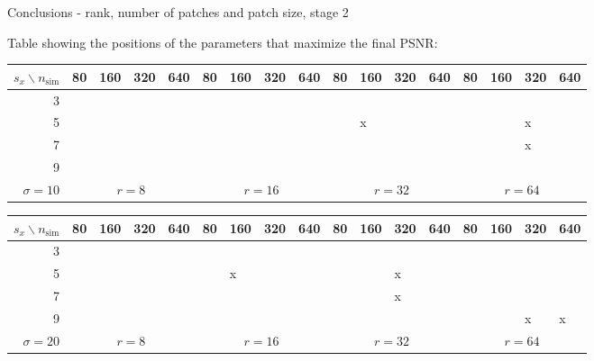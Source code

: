 \documentclass[mathserif, 8pt]{beamer}
\makeatletter
\newcounter{multipleslide}
\newcommand{\multipleframe}{%
\setcounter{multipleslide}{\value{framenumber}}
\stepcounter{multipleslide}
\patchcmd{\beamer@@tmpl@footline}%
	{\insertframenumber}%
	{\themultipleslide}%
	{}%
	{}%
}
\makeatother
\begin{document}
\multipleframe
\begin{frame}{Conclusions - rank, number of patches and patch size, stage 2}

	\begin{center}
		Table showing the positions of the parameters that maximize the final PSNR:

		\medskip

		{\small
		\begin{tabular}{r ||p{.1cm}|p{.1cm}|p{.1cm}|p{.1cm}||p{.1cm}|p{.1cm}|p{.1cm}|p{.1cm}||p{.1cm}|p{.1cm}|p{.1cm}|p{.1cm}||p{.1cm}|p{.1cm}|p{.1cm}|p{.1cm}||}
				$s_x \backslash n_{\text{sim}}$  & {\tiny 80} & {\tiny 160} & {\tiny 320} & {\tiny 640} & {\tiny 80} & {\tiny 160} & {\tiny 320} & {\tiny 640} & {\tiny 80} & {\tiny 160} & {\tiny 320} & {\tiny 640} & {\tiny 80} & {\tiny 160} & {\tiny 320} & {\tiny 640} \\\hline
		  3 &  &  &  &  &  &  &  &  &  &  &  &  &  &  &  &  \\[.1cm]\hline
		  5 &  &  &  &  &  &  &  &  &  &x &  &  &  &  &x &  \\[.1cm]\hline
		  7 &  &  &  &  &  &  &  &  &  &  &  &  &  &  &x &  \\[.1cm]\hline
		  9 &  &  &  &  &  &  &  &  &  &  &  &  &  &  &  &  \\[.1cm]\hline
		$\sigma=10$& \multicolumn{4}{c||}{$r =  8$} & 
		\multicolumn{4}{c||}{$r = 16$} & 
		\multicolumn{4}{c||}{$r = 32$} & 
		\multicolumn{4}{c||}{$r = 64$} 
		\end{tabular}}

		\medskip

		{\small
		\begin{tabular}{r ||p{.1cm}|p{.1cm}|p{.1cm}|p{.1cm}||p{.1cm}|p{.1cm}|p{.1cm}|p{.1cm}||p{.1cm}|p{.1cm}|p{.1cm}|p{.1cm}||p{.1cm}|p{.1cm}|p{.1cm}|p{.1cm}||}
				$s_x \backslash n_{\text{sim}}$  & {\tiny 80} & {\tiny 160} & {\tiny 320} & {\tiny 640} & {\tiny 80} & {\tiny 160} & {\tiny 320} & {\tiny 640} & {\tiny 80} & {\tiny 160} & {\tiny 320} & {\tiny 640} & {\tiny 80} & {\tiny 160} & {\tiny 320} & {\tiny 640} \\\hline
		  3 &  &  &  &  &  &  &  &  &  &  &  &  &  &  &  &  \\[.1cm]\hline
		  5 &  &  &  &  &  &x &  &  &  &  &x &  &  &  &  &  \\[.1cm]\hline
		  7 &  &  &  &  &  &  &  &  &  &  &x &  &  &  &  &  \\[.1cm]\hline
		  9 &  &  &  &  &  &  &  &  &  &  &  &  &  &  &x &x \\[.1cm]\hline
		$\sigma=20$& \multicolumn{4}{c||}{$r =  8$} & 
		\multicolumn{4}{c||}{$r = 16$} & 
		\multicolumn{4}{c||}{$r = 32$} & 
		\multicolumn{4}{c||}{$r = 64$} 
		\end{tabular}}


\end{center}
\end{frame}
\end{document}
